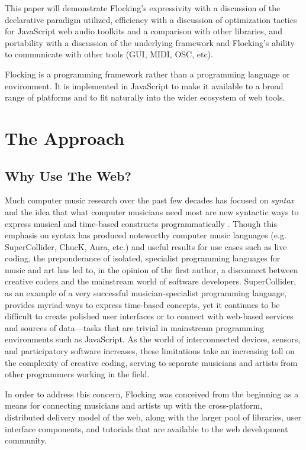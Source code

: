 \documentclass{article}
\begin{document}
This paper will demonstrate Flocking's expressivity with a discussion of the declarative paradigm utilized, efficiency with a discussion of optimization tactics for JavaScript web audio toolkits and a comparison with other libraries, and portability with a discussion of the underlying framework and Flocking's ability to communicate with other tools (GUI, MIDI, OSC, etc).

Flocking is a programming framework rather than a programming language or environment. It is implemented in JavaScript to make it available to a broad range of platforms and to fit naturally into the wider ecosystem of web tools.

\section{The Approach}

\subsection{Why Use The Web?}

Much computer music research over the past few decades has focused on {\it syntax} and the idea that what computer musicians need most are new syntactic ways to express musical and time-based constructs programmatically \cite{dannenberg2002language}. Though this emphasis on syntax has produced noteworthy computer music languages (e.g. SuperCollider, ChucK, Aura, etc.) and useful results for use cases such as live coding, the preponderance of isolated, specialist programming languages for music and art has led to, in the opinion of the first author, a disconnect between creative coders and the mainstream world of software developers. SuperCollider, as an example of a very successful musician-specialist programming language, provides myriad ways to express time-based concepts, yet it continues to be difficult to create polished user interfaces or to connect with web-based services and sources of data---tasks that are trivial in mainstream programming environments such as JavaScript. As the world of interconnected devices, sensors, and participatory software increases, these limitations take an increasing toll on the complexity of creative coding, serving to separate musicians and artists from other programmers working in the field.

In order to address this concern, Flocking was conceived from the beginning as a means for connecting musicians and artists up with the cross-platform, distributed delivery model of the web, along with the larger pool of libraries, user interface components, and tutorials that are available to the web development community.
\end{document}
